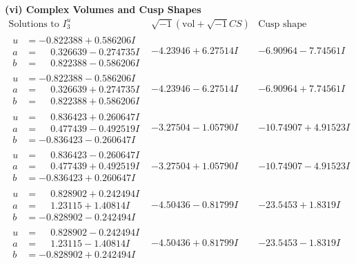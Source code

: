 \documentclass[1p]{elsarticle_modified}
\theoremstyle{definition}
\newcommand{\I}{\sqrt{-1}}
\begin{document}
\newpage\flushleft \textbf{(vi) Complex Volumes and Cusp Shapes}
$$\begin{array}{c|c|c}  
\text{Solutions to }I^u_{3}& \I (\text{vol} + \sqrt{-1}CS) & \text{Cusp shape}\\
 \hline 
\begin{aligned}
u &= -0.822388 + 0.586206 I \\
a &= \phantom{-}0.326639 - 0.274735 I \\
b &= \phantom{-}0.822388 - 0.586206 I\end{aligned}
 & -4.23946 + 6.27514 I & -6.90964 - 7.74561 I \\ \hline\begin{aligned}
u &= -0.822388 - 0.586206 I \\
a &= \phantom{-}0.326639 + 0.274735 I \\
b &= \phantom{-}0.822388 + 0.586206 I\end{aligned}
 & -4.23946 - 6.27514 I & -6.90964 + 7.74561 I \\ \hline\begin{aligned}
u &= \phantom{-}0.836423 + 0.260647 I \\
a &= \phantom{-}0.477439 - 0.492519 I \\
b &= -0.836423 - 0.260647 I\end{aligned}
 & -3.27504 - 1.05790 I & -10.74907 + 4.91523 I \\ \hline\begin{aligned}
u &= \phantom{-}0.836423 - 0.260647 I \\
a &= \phantom{-}0.477439 + 0.492519 I \\
b &= -0.836423 + 0.260647 I\end{aligned}
 & -3.27504 + 1.05790 I & -10.74907 - 4.91523 I \\ \hline\begin{aligned}
u &= \phantom{-}0.828902 + 0.242494 I \\
a &= \phantom{-}1.23115 + 1.40814 I \\
b &= -0.828902 - 0.242494 I\end{aligned}
 & -4.50436 - 0.81799 I & -23.5453 + 1.8319 I \\ \hline\begin{aligned}
u &= \phantom{-}0.828902 - 0.242494 I \\
a &= \phantom{-}1.23115 - 1.40814 I \\
b &= -0.828902 + 0.242494 I\end{aligned}
 & -4.50436 + 0.81799 I & -23.5453 - 1.8319 I \\ \hline\begin{aligned}

\end{aligned}
\end{array}$$
\end{document}
